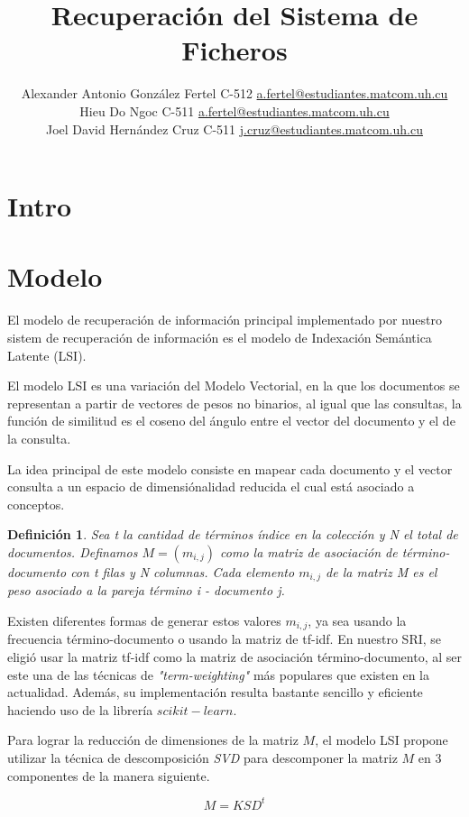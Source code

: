 \documentclass[a4paper, 10pt]{article}
\title{Recuperación del Sistema de Ficheros}
\author{Alexander Antonio González Fertel C-512 \hfill
		\href{mailto:a.fertel@estudiantes.matcom.uh.cu}{a.fertel@estudiantes.matcom.uh.cu}\\
		Hieu Do Ngoc C-511 \hfill
		\href{mailto:a.fertel@estudiantes.matcom.uh.cu}{a.fertel@estudiantes.matcom.uh.cu}\\
		Joel David Hernández Cruz C-511 \hfill
		\href{mailto:j.cruz@estudiantes.matcom.uh.cu}{j.cruz@estudiantes.matcom.uh.cu}}
\date{}
\newtheorem{definition}{Definici\'on}
\begin{document}
	\maketitle

	\section{Intro}
	
	\section{Modelo}
	El modelo de recuperaci\'on de informaci\'on principal implementado por nuestro sistem de recuperaci\'on de informaci\'on es el modelo de Indexaci\'on Sem\'antica Latente (LSI).
	
	El modelo LSI es una variación del Modelo Vectorial, en la que los documentos se representan a partir de vectores de pesos no binarios, al igual que las consultas, la función de similitud es el coseno del ángulo entre el vector del documento y el de la consulta.

	La idea principal de este modelo consiste en mapear cada documento y el vector consulta a un espacio de dimensi\'onalidad reducida el cual est\'a asociado a conceptos.
	
	\begin{definition}
		Sea t la cantidad de t\'erminos \'indice en la colecci\'on y N el total de documentos. Definamos $M=(m_{i,j})$ como la matriz de asociaci\'on de t\'ermino-documento con t filas y N columnas. Cada elemento $m_{i, j}$ de la matriz M es el peso asociado a la pareja t\'ermino i - documento j. 
	\end{definition}
	
	Existen diferentes formas de generar estos valores $m_{i,j}$, ya sea usando la frecuencia t\'ermino-documento o usando la matriz de tf-idf. En nuestro SRI, se eligi\'o usar la matriz tf-idf como la matriz de asociaci\'on t\'ermino-documento, al ser este una de las t\'ecnicas de \textit{"term-weighting"} m\'as populares que existen en la actualidad. Adem\'as, su implementaci\'on resulta bastante sencillo y eficiente haciendo uso de la librer\'ia $scikit-learn$.
	
	Para lograr la reducci\'on de dimensiones de la matriz $M$, el modelo LSI propone utilizar la t\'ecnica de descomposici\'on \textit{SVD} para descomponer la matriz $M$ en 3 componentes de la manera siguiente.

	\begin{equation}
		M = KSD^t
	\end{equation}
	
\end{document}
